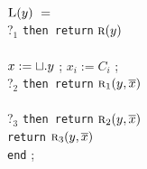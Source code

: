\documentclass[leqno]{article}
\newcommand{\ky}[1]{{\tt #1}}
\newcommand{\ina}{\hspace*{1em}}
\newcommand{\inb}{\hspace*{2em}}
\newcommand{\inc}{\hspace*{3.5em}}
\newcommand{\func}[1]{\mbox{\sc #1}}
\newcommand{\f}[1]{\func{#1}}
\begin{document}
\noindent
\hspace*{4em}
$\f L(y)\ =$ \\  \hspace*{4em}
\ina\ky{if} ?$_1$ \ky{then return} $\f r(y)$ \\  \hspace*{4em}
\ina\ky{else} \\  \hspace*{4em}
\inb $x:=\sqcup.y$ ; \ina $x_i:= C_i$ ; \\  \hspace*{4em}
\inb\ky{if} ?$_2$ \ky{then return} $\f r_1(y,\ovr x)$ \\  \hspace*{4em}
\inb\ky{else} \\ \hspace*{4em}
 \inc\ky{if} ?$_3$ \ky{then return} $\f r_2(y,\ovr x)$ \\  \hspace*{4em}
 \inc\ky{else} \ky{return} $\f r_3(y,\ovr x)$ \\  \hspace*{4em}
\ky{end} ;
\end{document}
